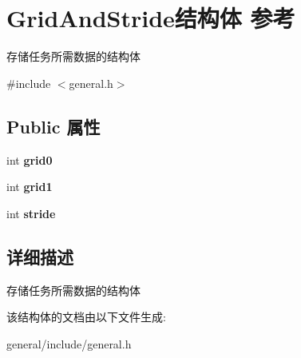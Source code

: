 \hypertarget{struct_grid_and_stride}{}\section{Grid\+And\+Stride结构体 参考}
\label{struct_grid_and_stride}


存储任务所需数据的结构体  




{\ttfamily \#include $<$general.\+h$>$}

\subsection*{Public 属性}
\begin{DoxyCompactItemize}
\item 
\mbox{\label{struct_grid_and_stride_a7e0b1a64294a1eb45475eac88e2e9914}} 
int {\bfseries grid0}
\item 
\mbox{\label{struct_grid_and_stride_a1c454a7403378c5de91132af3cb49027}} 
int {\bfseries grid1}
\item 
\mbox{\label{struct_grid_and_stride_aa7c9262a71737666910104247d35844b}} 
int {\bfseries stride}
\end{DoxyCompactItemize}


\subsection{详细描述}
存储任务所需数据的结构体 

该结构体的文档由以下文件生成\+:\begin{DoxyCompactItemize}
\item 
general/include/general.\+h\end{DoxyCompactItemize}
